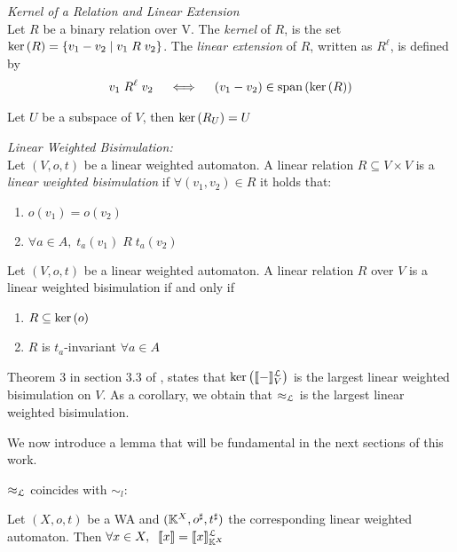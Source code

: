 \begin{defn}
  \textit{Kernel of a Relation and Linear Extension} \\
  Let $R$ be a binary relation over V. 
  The \textit{kernel} of $R$, is the set 
  $\text{ker}\left(R\right) = \left\lbrace v_1 - v_2 \mid v_1 \; R \; v_2 \right\rbrace$.
  The \textit{linear extension} of $R$, written as $R^\ell$, is defined by 
  \begin{equation*}
    \begin{aligned}
      v_1 \; R^\ell \; v_2  \quad \iff \quad (v_1 - v_2) \in \text{span}\left(\text{ker}\left(R\right)\right)
    \end{aligned}
  \end{equation*}
\end{defn}

\begin{lem}
  Let $U$ be a subspace of $V$, then $\text{ker}\left(R_U\right) = U$
\end{lem}

\begin{defn}
  \textit{Linear Weighted Bisimulation:} \\
  Let $(V, o, t)$ be a linear weighted automaton. A linear relation 
  $R \subseteq V \times V$ is a \textit{linear weighted bisimulation} if 
  $\forall (v_1, v_2) \in R$ it holds that: 
  \begin{center}
    \begin{enumerate}
      \item $o(v_1) = o(v_2)$
      \item $\forall a \in A, \; t_a(v_1) \; R \; t_a(v_2)$
    \end{enumerate}
  \end{center}
\end{defn}

\begin{lem}
  Let $(V, o, t)$ be a linear weighted automaton. A linear relation 
  $R$ over $V$ is a linear weighted bisimulation if and only if
\end{lem}
  \begin{center}
    \begin{enumerate}
      \item $R \subseteq \text{ker}\left(o\right)$
      \item $R$ is $t_a$-invariant $\forall a \in A$
    \end{enumerate}
  \end{center}

Theorem 3 in section 3.3 of \cite{BONCHI201277}, states that 
$\text{ker}\left(\llbracket-\rrbracket^\mathcal{L}_{V}\right)$ is the largest linear weighted bisimulation on $V$.
As a corollary, we obtain that $\approx_{\mathcal{L}}$ is the largest linear weighted bisimulation.

We now introduce a lemma that will be fundamental in the next sections of this work.

\begin{lem}
  \label{lem:coincide}
  $\approx_{\mathcal{L}}$ coincides with $\sim_l$: 

  Let $(X, o, t)$ be a WA and $(\mathbb{K}^X, o^\sharp, t^\sharp)$ the corresponding linear 
  weighted automaton. Then $\forall x \in X, \;\; \llbracket x\rrbracket = \llbracket x\rrbracket^\mathcal{L}_{\mathbb{K}^X}$
\end{lem}